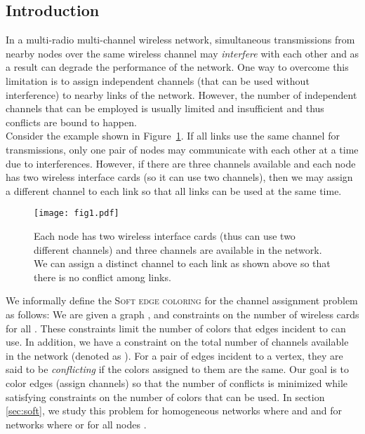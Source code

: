 \documentclass[titlepage, 11pt]{article}
\newcommand{\B}{\vspace*{-\smallskipamount}}
\begin{document}
\subsection{Introduction}
In a  multi-radio multi-channel wireless network, simultaneous transmissions from nearby nodes over the same wireless channel may \emph{interfere} with each other and as a result can degrade the performance of the network.
One way to overcome this limitation is to assign independent channels (that can be used without interference) to nearby links of the network. However, the number of independent channels that can be employed is usually limited and insufficient and thus conflicts are bound to happen.\\
\B 
Consider the example shown in Figure~\ref{fig:3node}.
If all links use the same channel for transmissions, only one 
pair of nodes may communicate with each other at a time
due to interferences.  However, if there are three channels available 
and each node has two wireless interface cards (so 
it can use two channels), then we may assign a different channel to each link so that all links can be used at the same time. 

\begin{figure}[h]
\begin{center}
    \centerline{\texttt{[image: fig1.pdf]}}
    \caption{\small Each node has two wireless interface cards 
(thus can use two different channels) and three channels are available in the network.
	We can assign a distinct channel to each link as shown above so that 
there is no conflict among links.
\label{fig:3node}}
\vspace{-0.3in}
\end{center}
\end{figure}

We informally define the \textsc{Soft edge coloring} for the channel assignment  problem as follows:
We are given a graph , and constraints on the number of 
wireless cards  for all . These constraints limit the number
of colors that edges incident to  can use. 
In addition, we have a constraint on the total number
of channels available in the network (denoted as ).
For a pair of edges incident to a vertex, they are said to be {\em conflicting} 
if the colors assigned to them are the same.
Our goal is to color edges (assign channels) so that
the number of conflicts is minimized while satisfying 
constraints on the number of colors that can be used. 
In section \ref{sec:soft}, we study this problem for homogeneous networks where 
and   and for networks  where  or  for all nodes . \\
\end{document}
